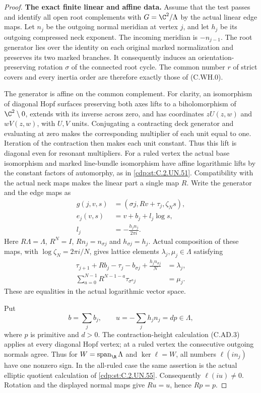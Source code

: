 \begin{proof}
\par\medskip\noindent\textbf{The exact finite linear and affine data.}
Assume that the test passes and identify all open root
complements with $G=\C^2/\Lambda$ by the actual linear
edge maps. Let $n_j$ be the outgoing normal meridian at
vertex $j$, and let $h_j$ be its outgoing compressed
neck exponent. The incoming meridian is $-n_{j-1}$.
The root generator lies over the identity on each original
marked normalization and preserves its two marked branches.
It consequently induces an orientation-preserving rotation
$\sigma$ of the connected root cycle. The common number
$r$ of strict covers and every inertia order are therefore
exactly those of (C.WH.0).

The generator is affine on the common complement. For clarity,
an isomorphism of diagonal Hopf surfaces preserving both axes
lifts to a biholomorphism of $\C^2\setminus0$, extends with
its inverse across zero, and has coordinates $zU(z,w)$ and
$wV(z,w)$, with $U,V$ units. Conjugating a contracting deck
generator and evaluating at zero makes the corresponding
multiplier of each unit equal to one. Iteration of the
contraction then makes each unit constant. Thus this lift
is diagonal even for resonant multipliers. For a ruled
vertex the actual base isomorphism and marked line-bundle
isomorphism have affine logarithmic lifts by the constant
factors of automorphy, as in \ref{cdp:st:C.2.UN.51}. Compatibility with the
actual neck maps makes the linear part a single map $R$.
Write the generator and the edge maps as
\[
 \begin{aligned}
 g(j,v,s)&=(\sigma j,Rv+\tau_j,\zeta_Ns),\\
 e_j(v,s)&=v+b_j+l_j\log s,\\
 l_j&=-\frac{h_j n_j}{2\pi i}.
 \end{aligned}
\tag{C.EW.2}\label{cdp:eq:C.EW.2}
\]
Here $R\Lambda=\Lambda$, $R^N=I$,
$Rn_j=n_{\sigma j}$ and $h_{\sigma j}=h_j$.
Actual composition of these maps, with
$\log\zeta_N=2\pi i/N$, gives lattice elements
$\lambda_j,\mu_j\in\Lambda$ satisfying
\[
 \begin{aligned}
 \tau_{j+1}+Rb_j-\tau_j-b_{\sigma j}
             +\frac{h_j n_{\sigma j}}N&=\lambda_j,\\
 \sum_{a=0}^{N-1}R^{N-1-a}\tau_{\sigma^a j}&=\mu_j.
 \end{aligned}
\tag{C.EW.3}\label{cdp:eq:C.EW.3}
\]
These are equalities in the actual logarithmic vector space.

Put
\[
             b=\sum_jb_j,\qquad
             u=-\sum_jh_jn_j=d p\in\Lambda,
\tag{C.EW.4}\label{cdp:eq:C.EW.4}
\]
where $p$ is primitive and $d>0$. The contraction-height
calculation (C.AD.3) applies at every diagonal Hopf vertex;
at a ruled vertex the consecutive outgoing normals agree.
Thus for $W=\operatorname{span}_{\R}\Lambda$ and
$\ker\ell=W$, all numbers $\ell(i n_j)$ have one
nonzero sign. In the all-ruled case the same assertion
is the actual elliptic quotient calculation of \ref{cdp:st:C.2.UN.55}.
Consequently $\ell(iu)\ne0$. Rotation and the displayed
normal maps give $Ru=u$, hence $Rp=p$.


\end{proof}
